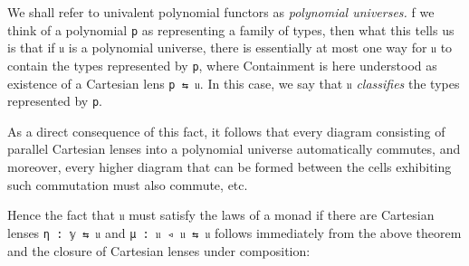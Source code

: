 \documentclass[
  11pt,
  oneside,
  article]{memoir}
\theoremstyle{definition}
\theoremstyle{plain}
\newcommand{\0}{\textsf{0}}
\newcommand{\1}{\tn{\textsf{1}}}
\begin{document}
We shall refer to univalent polynomial functors as \emph{polynomial
universes.} f we think of a polynomial \texttt{p} as representing a
family of types, then what this tells us is that if \texttt{𝔲} is a
polynomial universe, there is essentially at most one way for \texttt{𝔲}
to contain the types represented by \texttt{p}, where Containment is
here understood as existence of a Cartesian lens \texttt{p\ ⇆\ 𝔲}. In
this case, we say that \texttt{𝔲} \emph{classifies} the types
represented by \texttt{p}.

As a direct consequence of this fact, it follows that every diagram
consisting of parallel Cartesian lenses into a polynomial universe
automatically commutes, and moreover, every higher diagram that can be
formed between the cells exhibiting such commutation must also commute,
etc.

Hence the fact that \texttt{𝔲} must satisfy the laws of a monad if there
are Cartesian lenses \texttt{η\ :\ 𝕪\ ⇆\ 𝔲} and
\texttt{μ\ :\ 𝔲\ ◃\ 𝔲\ ⇆\ 𝔲} follows immediately from the above theorem
and the closure of Cartesian lenses under composition:
\end{document}
